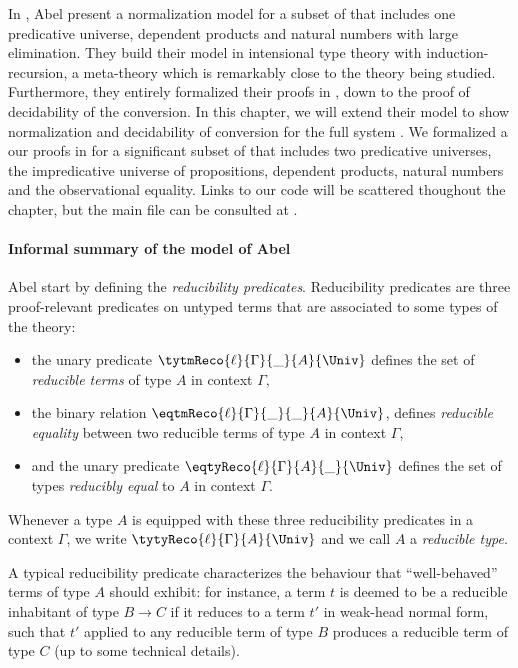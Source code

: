 In , Abel \etal present a normalization model for a 
subset of \MLTT that includes one predicative universe, dependent products and 
natural numbers with large elimination.
% 
They build their model in intensional type theory with induction-recursion, 
a meta-theory which is remarkably close to the theory being studied.
% 
Furthermore, they entirely formalized their proofs in \Agda, down to the proof
of decidability of the conversion.
% 
In this chapter, we will extend their model to show normalization and decidability
of conversion for the full system \SetoidCC.
% 
We formalized a our proofs in \Agda for a significant subset of \SetoidCC that
includes two predicative universes, the impredicative universe of propositions, 
dependent products, natural numbers and the observational equality. 
% 
Links to our code will be scattered thoughout the chapter, but 
the main file can be consulted at .

\paragraph*{Informal summary of the model of Abel \etal}
% 
Abel \etal start by defining the \emph{reducibility predicates}. 
Reducibility predicates are three proof-relevant predicates on untyped 
terms that are associated to some types of the theory:
% 
\begin{itemize}
\item the unary predicate \( {\tytmReco{\ell}{\Gamma}{\_}{A}{\Univ}} \) 
  defines the set of \emph{reducible terms} of type \( A \) in context \( \Gamma \),
\item the binary relation \( {\eqtmReco{\ell}{\Gamma}{\_}{\_}{A}{\Univ}} \), 
  defines \emph{reducible equality} between two reducible terms of type \( A \) in context \( \Gamma \),
\item and the unary predicate \( {\eqtyReco{\ell}{\Gamma}{A}{\_}{\Univ}} \) 
  defines the set of types \emph{reducibly equal} to \( A \) in context \( \Gamma \).
\end{itemize}
% 
Whenever a type \( A \) is equipped with these three reducibility predicates in a
context \( \Gamma \), we write \( \tytyReco{\ell}{\Gamma}{A}{\Univ} \) and we call 
\( A \) a \emph{reducible type}.

A typical reducibility predicate characterizes the behaviour that ``well-behaved''
terms of type \( A \) should exhibit: for instance, a term \( t \) is deemed
to be a reducible inhabitant of type \( B \to C \) if it reduces to a term 
\( {t'} \) in weak-head normal form, such that \( {t'} \) applied to
any reducible term of type \( B \) produces a reducible term of type \( C \)
(up to some technical details).

